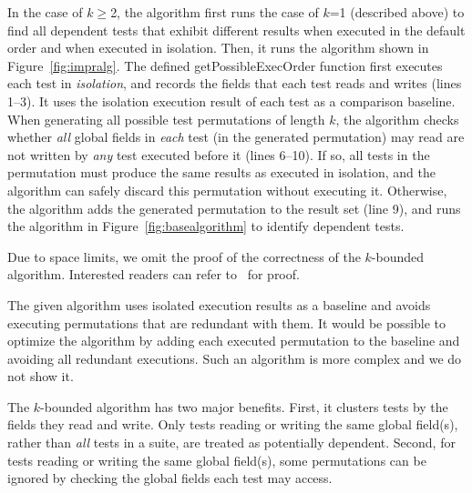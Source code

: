 In the case of $k$$\ge$2, the algorithm first runs the case of $k$=1 (described above)
to find all dependent tests that exhibit different results
when executed in the default order and when executed in isolation.
Then, it runs the algorithm shown in Figure~\ref{fig:impralg}.
%
The defined getPossibleExecOrder function first executes
each test in \textit{isolation}, and records the
fields that each test reads and writes (lines 1--3).
It uses the isolation execution result
of each test as a comparison baseline.
When generating all possible test permutations
of length $k$, the algorithm checks whether
\textit{all} global fields in \textit{each} test (in the generated permutation)
may read are not written by \textit{any} test executed before it (lines 6--10).
If so, all tests in the permutation
must produce the same results as executed in isolation,
and the algorithm can safely discard this permutation without
executing it. Otherwise, the algorithm adds the generated
permutation to the result set (line 9), and runs the algorithm in Figure~\ref{fig:basealgorithm}
to identify dependent tests. %

Due to space limits, we omit the proof of the correctness
of the \dependenceaware{} $k$-bounded algorithm. Interested
readers can refer to~\cite{proof-dependence-aware} for proof.

The given algorithm uses isolated execution results as a baseline and
avoids executing permutations that are redundant with them.  It would be
possible to optimize the algorithm by adding each executed permutation to
the baseline and avoiding all redundant executions.  Such an algorithm is
more complex and we do not show it.

The \dependenceaware{} $k$-bounded algorithm has two major benefits.
First, it clusters tests by the fields they
read and write. Only tests reading or writing
the same global field(s), rather than \textit{all} tests
in a suite, are treated as potentially dependent.
Second, for tests reading or writing the same global
field(s), some permutations can be ignored by checking
the global fields each test may access. 

